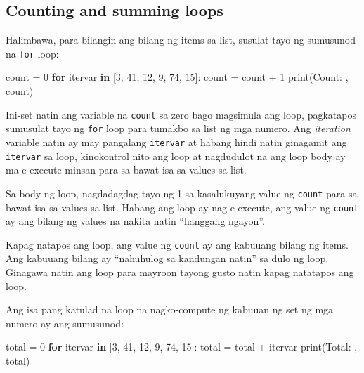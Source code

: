 \documentclass[10pt,]{book}
\newenvironment{Shaded}{}{}
\newcommand{\BuiltInTok}[1]{\textcolor[rgb]{0.00,0.50,0.00}{#1}}
\newcommand{\ControlFlowTok}[1]{\textcolor[rgb]{0.00,0.44,0.13}{\textbf{#1}}}
\newcommand{\DecValTok}[1]{\textcolor[rgb]{0.25,0.63,0.44}{#1}}
\newcommand{\KeywordTok}[1]{\textcolor[rgb]{0.00,0.44,0.13}{\textbf{#1}}}
\newcommand{\NormalTok}[1]{#1}
\newcommand{\OperatorTok}[1]{\textcolor[rgb]{0.40,0.40,0.40}{#1}}
\newcommand{\StringTok}[1]{\textcolor[rgb]{0.25,0.44,0.63}{#1}}
\begin{document}
\subsection{Counting and summing
loops}\label{counting-and-summing-loops}

Halimbawa, para bilangin ang bilang ng items sa list, susulat tayo ng
sumusunod na \texttt{for} loop:

\begin{Shaded}
\begin{Highlighting}[]
\NormalTok{count }\OperatorTok{=} \DecValTok{0}
\ControlFlowTok{for}\NormalTok{ itervar }\KeywordTok{in}\NormalTok{ [}\DecValTok{3}\NormalTok{, }\DecValTok{41}\NormalTok{, }\DecValTok{12}\NormalTok{, }\DecValTok{9}\NormalTok{, }\DecValTok{74}\NormalTok{, }\DecValTok{15}\NormalTok{]:}
\NormalTok{    count }\OperatorTok{=}\NormalTok{ count }\OperatorTok{+} \DecValTok{1}
\BuiltInTok{print}\NormalTok{(}\StringTok{\textquotesingle{}Count: \textquotesingle{}}\NormalTok{, count)}
\end{Highlighting}
\end{Shaded}

Ini-set natin ang variable na \texttt{count} sa zero bago magsimula ang
loop, pagkatapos sumusulat tayo ng \texttt{for} loop para tumakbo sa
list ng mga numero. Ang \emph{iteration} variable natin ay may pangalang
\texttt{itervar} at habang hindi natin ginagamit ang \texttt{itervar} sa
loop, kinokontrol nito ang loop at nagdudulot na ang loop body ay
ma-e-execute minsan para sa bawat isa sa values sa list.

Sa body ng loop, nagdadagdag tayo ng 1 sa kasalukuyang value ng
\texttt{count} para sa bawat isa sa values sa list. Habang ang loop ay
nag-e-execute, ang value ng \texttt{count} ay ang bilang ng values na
nakita natin ``hanggang ngayon''.

Kapag natapos ang loop, ang value ng \texttt{count} ay ang kabuuang
bilang ng items. Ang kabuuang bilang ay ``nahuhulog sa kandungan natin''
sa dulo ng loop. Ginagawa natin ang loop para mayroon tayong gusto natin
kapag natatapos ang loop.

Ang isa pang katulad na loop na nagko-compute ng kabuuan ng set ng mga
numero ay ang sumusunod:

\begin{Shaded}
\begin{Highlighting}[]
\NormalTok{total }\OperatorTok{=} \DecValTok{0}
\ControlFlowTok{for}\NormalTok{ itervar }\KeywordTok{in}\NormalTok{ [}\DecValTok{3}\NormalTok{, }\DecValTok{41}\NormalTok{, }\DecValTok{12}\NormalTok{, }\DecValTok{9}\NormalTok{, }\DecValTok{74}\NormalTok{, }\DecValTok{15}\NormalTok{]:}
\NormalTok{    total }\OperatorTok{=}\NormalTok{ total }\OperatorTok{+}\NormalTok{ itervar}
\BuiltInTok{print}\NormalTok{(}\StringTok{\textquotesingle{}Total: \textquotesingle{}}\NormalTok{, total)}
\end{Highlighting}
\end{Shaded}
\end{document}

